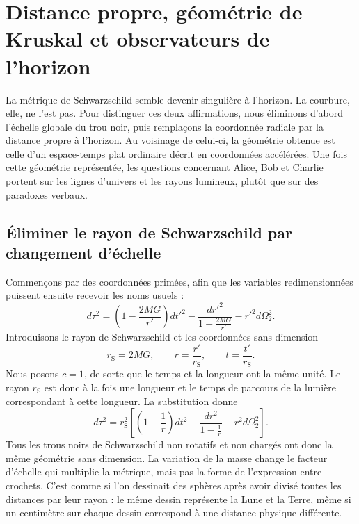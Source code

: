 \chapter{Distance propre, géométrie de Kruskal et observateurs de l’horizon}

La métrique de Schwarzschild semble devenir singulière à l’horizon. La courbure, elle, ne l’est pas. Pour distinguer ces deux affirmations, nous éliminons d’abord l’échelle globale du trou noir, puis remplaçons la coordonnée radiale par la distance propre à l’horizon. Au voisinage de celui-ci, la géométrie obtenue est celle d’un espace-temps plat ordinaire décrit en coordonnées accélérées. Une fois cette géométrie représentée, les questions concernant Alice, Bob et Charlie portent sur les lignes d’univers et les rayons lumineux, plutôt que sur des paradoxes verbaux.

\section{Éliminer le rayon de Schwarzschild par changement d’échelle}

Commençons par des coordonnées primées, afin que les variables redimensionnées puissent ensuite recevoir les noms usuels :
\begin{equation}
d\tau^2
=
\left(1-\frac{2MG}{r'}\right)dt'^2
-
\frac{dr'^2}{1-\frac{2MG}{r'}}
-
r'^2d\Omega_2^2.
\label{eq:l7-schwarzschild-dimensional}
\end{equation}
Introduisons le rayon de Schwarzschild et les coordonnées sans dimension
\begin{equation}
r_{\mathrm S}=2MG,
\qquad
r=\frac{r'}{r_{\mathrm S}},
\qquad
t=\frac{t'}{r_{\mathrm S}}.
\label{eq:l7-rescaling}
\end{equation}
Nous posons \(c=1\), de sorte que le temps et la longueur ont la même unité. Le rayon \(r_{\mathrm S}\) est donc à la fois une longueur et le temps de parcours de la lumière correspondant à cette longueur. La substitution donne
\begin{equation}
d\tau^2
=r_{\mathrm S}^2
\left[
\left(1-\frac1r\right)dt^2
-
\frac{dr^2}{1-\frac1r}
-
r^2d\Omega_2^2
\right].
\label{eq:l7-schwarzschild-rescaled}
\end{equation}
Tous les trous noirs de Schwarzschild non rotatifs et non chargés ont donc la même géométrie sans dimension. La variation de la masse change le facteur d’échelle qui multiplie la métrique, mais pas la forme de l’expression entre crochets. C’est comme si l’on dessinait des sphères après avoir divisé toutes les distances par leur rayon : le même dessin représente la Lune et la Terre, même si un centimètre sur chaque dessin correspond à une distance physique différente.

